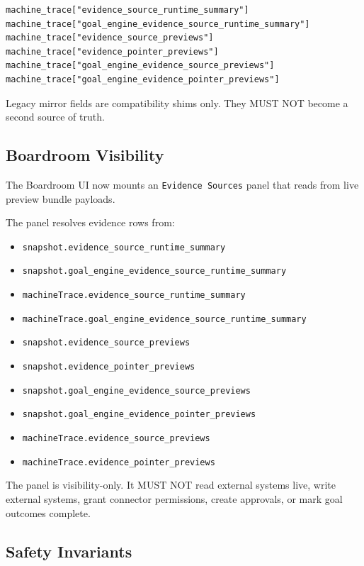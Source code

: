 \begin{verbatim}
machine_trace["evidence_source_runtime_summary"]
machine_trace["goal_engine_evidence_source_runtime_summary"]
machine_trace["evidence_source_previews"]
machine_trace["evidence_pointer_previews"]
machine_trace["goal_engine_evidence_source_previews"]
machine_trace["goal_engine_evidence_pointer_previews"]
\end{verbatim}

Legacy mirror fields are compatibility shims only. They MUST NOT become a second source of truth.

\subsection{Boardroom Visibility}

The Boardroom UI now mounts an \texttt{Evidence Sources} panel that reads from live preview bundle payloads.

The panel resolves evidence rows from:

\begin{itemize}
  \item \texttt{snapshot.evidence\_source\_runtime\_summary}
  \item \texttt{snapshot.goal\_engine\_evidence\_source\_runtime\_summary}
  \item \texttt{machineTrace.evidence\_source\_runtime\_summary}
  \item \texttt{machineTrace.goal\_engine\_evidence\_source\_runtime\_summary}
  \item \texttt{snapshot.evidence\_source\_previews}
  \item \texttt{snapshot.evidence\_pointer\_previews}
  \item \texttt{snapshot.goal\_engine\_evidence\_source\_previews}
  \item \texttt{snapshot.goal\_engine\_evidence\_pointer\_previews}
  \item \texttt{machineTrace.evidence\_source\_previews}
  \item \texttt{machineTrace.evidence\_pointer\_previews}
\end{itemize}

The panel is visibility-only. It MUST NOT read external systems live, write external systems, grant connector permissions, create approvals, or mark goal outcomes complete.

\subsection{Safety Invariants}

